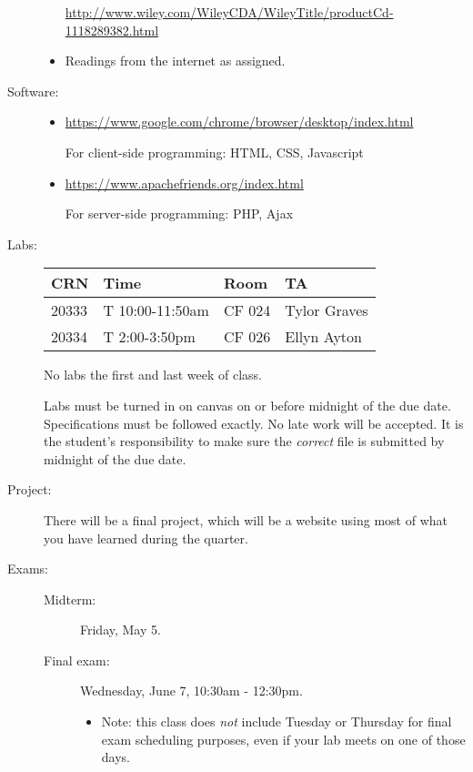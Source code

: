 \documentclass{article}
\begin{document}
\begin{description}
\begin{itemize}
    \url{http://www.wiley.com/WileyCDA/WileyTitle/productCd-1118289382.html}
  \item Readings from the internet as assigned.
  \end{itemize}
  

\item[Software:]\mbox{}
  
  \begin{itemize}
  \item \url{https://www.google.com/chrome/browser/desktop/index.html}

    For client-side programming: HTML, CSS, Javascript
  \item\url{https://www.apachefriends.org/index.html}

    For server-side programming: PHP, Ajax
  \end{itemize}

\item[Labs:]\mbox{}

  \begin{tabular}{|l|l|l|l|}\hline
    CRN & Time & Room & TA \\\hline
    20333 & T 10:00-11:50am & CF 024 & Tylor Graves \\\hline
    20334 & T 2:00-3:50pm & CF 026 & Ellyn Ayton \\\hline
  \end{tabular}
  
No labs the first and last week of class.

Labs must be turned in on canvas on or before midnight of
  the due date.  Specifications must be followed exactly.  No late
  work will be accepted.  It is the student's responsibility to make
  sure the {\em correct} file is submitted by midnight of the due
  date.

\item[Project:]  There will be a final project, which will be a
  website using most of what you have learned during the quarter.

\item[Exams:]\mbox{}
  
  \begin{description}
  \item[Midterm:]  Friday, May 5.
  \item[Final exam:] Wednesday, June 7, 10:30am - 12:30pm.
    \begin{itemize}
      \item Note:  this class does {\em not} include Tuesday or
        Thursday for final exam scheduling purposes,
        even if your lab meets on one of those days.
    \end{itemize}
  \end{description}
  

\end{description}
\end{document}
